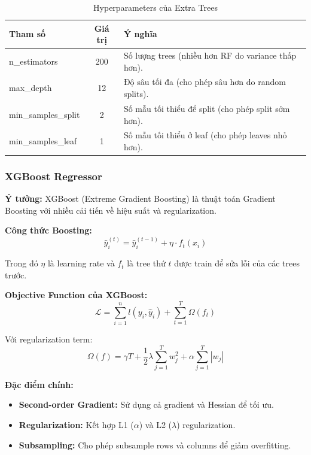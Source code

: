 \documentclass[12pt,a4paper]{article}
\begin{document}
\begin{table}[H]
\centering
\caption{Hyperparameters của Extra Trees}
\begin{tabular}{|l|c|p{7cm}|}
\hline
\textbf{Tham số} & \textbf{Giá trị} & \textbf{Ý nghĩa} \\
\hline
n\_estimators & 200 & Số lượng trees (nhiều hơn RF do variance thấp hơn). \\
\hline
max\_depth & 12 & Độ sâu tối đa (cho phép sâu hơn do random splits). \\
\hline
min\_samples\_split & 2 & Số mẫu tối thiểu để split (cho phép split sớm hơn). \\
\hline
min\_samples\_leaf & 1 & Số mẫu tối thiểu ở leaf (cho phép leaves nhỏ hơn). \\
\hline
\end{tabular}
\end{table}

\subsubsection{XGBoost Regressor}

\textbf{Ý tưởng:} XGBoost (Extreme Gradient Boosting) là thuật toán Gradient Boosting với nhiều cải tiến về hiệu suất và regularization.

\textbf{Công thức Boosting:}
\begin{equation}
\hat{y}_i^{(t)} = \hat{y}_i^{(t-1)} + \eta \cdot f_t(x_i)
\end{equation}

Trong đó $\eta$ là learning rate và $f_t$ là tree thứ $t$ được train để sửa lỗi của các trees trước.

\textbf{Objective Function của XGBoost:}
\begin{equation}
\mathcal{L} = \sum_{i=1}^{n} l(y_i, \hat{y}_i) + \sum_{t=1}^{T} \Omega(f_t)
\end{equation}

Với regularization term:
\begin{equation}
\Omega(f) = \gamma T + \frac{1}{2}\lambda \sum_{j=1}^{T} w_j^2 + \alpha \sum_{j=1}^{T} |w_j|
\end{equation}

\textbf{Đặc điểm chính:}
\begin{itemize}
    \item \textbf{Second-order Gradient:} Sử dụng cả gradient và Hessian để tối ưu.
    \item \textbf{Regularization:} Kết hợp L1 ($\alpha$) và L2 ($\lambda$) regularization.
    \item \textbf{Subsampling:} Cho phép subsample rows và columns để giảm overfitting.
\end{itemize}
\end{document}

